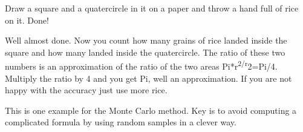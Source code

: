 
Draw a square and a quatercircle in it on a paper and throw a hand full of rice on it. Done!

Well almost done. Now you count how many grains of rice landed inside the square and how many landed inside the quatercircle.
The ratio of these two numbers is an approximation of the ratio of the two areas Pi*r\textsuperscript{2/r}2=Pi/4.
Multiply the ratio by 4 and you get Pi, well an approximation. If you are not happy with the accuracy just use more rice.

This is one example for the Monte Carlo method. Key is to avoid computing a complicated formula by using random samples in a clever way.


